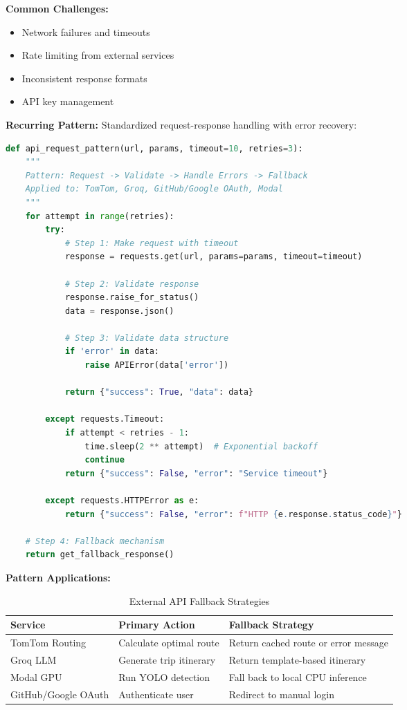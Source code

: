 \textbf{Common Challenges:}
\begin{itemize}[noitemsep]
    \item Network failures and timeouts
    \item Rate limiting from external services
    \item Inconsistent response formats
    \item API key management
\end{itemize}

\textbf{Recurring Pattern:} Standardized request-response handling with error recovery:

\begin{lstlisting}[language=Python, caption={External API Integration Pattern}]
def api_request_pattern(url, params, timeout=10, retries=3):
    """
    Pattern: Request -> Validate -> Handle Errors -> Fallback
    Applied to: TomTom, Groq, GitHub/Google OAuth, Modal
    """
    for attempt in range(retries):
        try:
            # Step 1: Make request with timeout
            response = requests.get(url, params=params, timeout=timeout)
            
            # Step 2: Validate response
            response.raise_for_status()
            data = response.json()
            
            # Step 3: Validate data structure
            if 'error' in data:
                raise APIError(data['error'])
            
            return {"success": True, "data": data}
            
        except requests.Timeout:
            if attempt < retries - 1:
                time.sleep(2 ** attempt)  # Exponential backoff
                continue
            return {"success": False, "error": "Service timeout"}
            
        except requests.HTTPError as e:
            return {"success": False, "error": f"HTTP {e.response.status_code}"}
    
    # Step 4: Fallback mechanism
    return get_fallback_response()
\end{lstlisting}

\textbf{Pattern Applications:}
\begin{table}[H]
    \centering
    \renewcommand{\arraystretch}{1.2}
    \begin{tabularx}{\textwidth}{|l|X|X|}
        \hline
        \textbf{Service} & \textbf{Primary Action} & \textbf{Fallback Strategy} \\
        \hline
        TomTom Routing & Calculate optimal route & Return cached route or error message \\
        \hline
        Groq LLM & Generate trip itinerary & Return template-based itinerary \\
        \hline
        Modal GPU & Run YOLO detection & Fall back to local CPU inference \\
        \hline
        GitHub/Google OAuth & Authenticate user & Redirect to manual login \\
        \hline
    \end{tabularx}
    \caption{External API Fallback Strategies}
\end{table}

